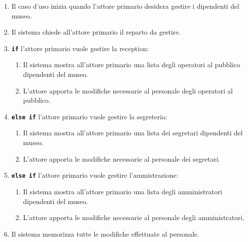 \documentclass{article}
\begin{document}
		\begin{enumerate}[itemsep=8pt,parsep=0pt]
		
		\item Il caso d’uso inizia quando l’attore primario desidera gestire i dipendenti del museo.
		\item Il sistema chiede all'attore primario il reparto da gestire.
		\item \texttt{\textbf{if}} l'attore primario vuole gestire la reception:
			\begin{enumerate}	[leftmargin=28pt]
				\item Il sistema mostra all'attore primario una lista degli operatori al pubblico dipendenti del museo.
				\item L'attore apporta le modifiche necessarie al personale degli operatori al pubblico.
  			\end{enumerate}	
		\item \texttt{\textbf{else if}} l'attore primario vuole gestire la segreteria:
			\begin{enumerate}	[leftmargin=28pt]
				\item Il sistema mostra all'attore primario una lista dei segretari dipendenti del museo.
				\item L'attore apporta le modifiche necessarie al personale dei segretari.
  			\end{enumerate}

		\item \texttt{\textbf{else if}} l'attore primario vuole gestire l'ammistrazione:
			\begin{enumerate}	[leftmargin=28pt]
				\item Il sistema mostra all'attore primario una lista degli amministratori dipendenti del museo.
				\item L'attore apporta le modifiche necessarie al personale degli amministratori.
  			\end{enumerate}

		\item Il sistema memorizza tutte le modifiche effettuate al personale.

	\end{enumerate}
	
	
	
	
	
\end{document}
